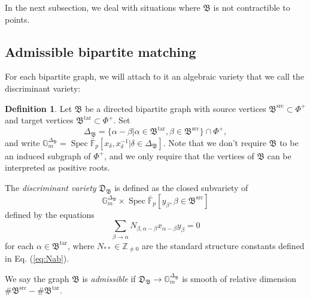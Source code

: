 \documentclass[11pt]{amsart}
\newcommand{\MINOREDITED}[1]{#1}
\theoremstyle{definition}
\newtheorem{defn}[thm]{Definition}
\newcommand{\Z}{\mathbb{Z}}
\newcommand{\G}{\mathbb{G}}
\newcommand{\fB}{\mathfrak{B}}
\newcommand{\fD}{\mathfrak{D}}
\newcommand{\bFp}{\bar{\mathbb{F}}_p}
\DeclareMathOperator{\src}{src}
\DeclareMathOperator{\tar}{tar}
\DeclareMathOperator{\Spec}{Spec}
\begin{document}
In the next subsection,
we deal with situations
where $\fB$ is not contractible to points.

\subsection{Admissible bipartite matching}

For each bipartite graph, we will attach to it an
algebraic variety that we call
the discriminant variety:

\begin{defn}
Let $\fB$ be a directed bipartite graph
with source vertices $\fB^{\src}\subset \Phi^+$
and target vertices $\fB^{\tar}\subset \Phi^+$.
Set
\[
\Delta_{\fB}=\{\alpha-\beta| \alpha\in \fB^{\tar},
\beta\in \fB^{\src}\}\cap \Phi^+,
\]
and write
$\G_m^{\Delta_\fB}=\Spec \bFp[x_\delta, x_\delta^{-1}|\delta\in \Delta_\fB]$.
Note that we don't require $\fB$ to be an induced subgraph
of $\Phi^+$,
and we only require that the vertices of $\fB$
can be interpreted as positive roots.

The {\it discriminant variety}
$\fD_{\fB}$ is defined as
the closed subvariety
of
\[
\G_m^{\Delta_\fB} \times \Spec \bFp [y_\beta, \beta\in \fB^{\src}]
\]
defined by the equations
\[
\sum_{\beta\to \alpha} N_{\beta, \alpha-\beta}
x_{\alpha-\beta}y_\beta=0
\]
for each $\alpha\in \fB^{\tar}$,
where $N_{**}\in \Z_{\neq 0}$ 
\MINOREDITED{are the standard structure constants}
defined in Eq. (\ref{eq:Nab}).

We say the graph $\fB$ is {\it admissible}
if $\fD_{\fB}\to \G_m^{\Delta_\fB}$ is smooth
of relative dimension $\#\fB^{\src}-\#\fB^{\tar}$.
\label{def:admissible}
\end{defn}
\end{document}
